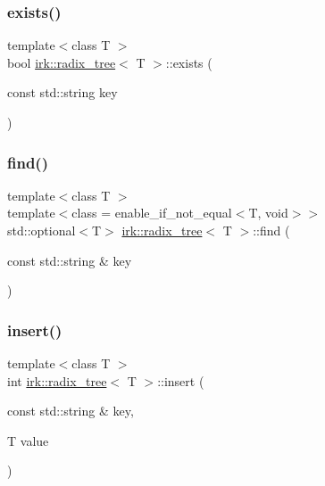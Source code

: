 \mbox{\label{classirk_1_1radix__tree_aaedca67d183c9b0b4f64c1b6ae240d7b}} 
\subsubsection{\texorpdfstring{exists()}{exists()}}
{\footnotesize\ttfamily template$<$class T $>$ \\
bool \mbox{\hyperlink{classirk_1_1radix__tree}{irk\+::radix\+\_\+tree}}$<$ T $>$\+::exists (\begin{DoxyParamCaption}\item[{const std\+::string}]{key }\end{DoxyParamCaption})\hspace{0.3cm}{\ttfamily [inline]}}

\mbox{\label{classirk_1_1radix__tree_a7a8f4484dd52244e712e204288e00b15}} 
\subsubsection{\texorpdfstring{find()}{find()}}
{\footnotesize\ttfamily template$<$class T $>$ \\
template$<$class  = enable\+\_\+if\+\_\+not\+\_\+equal$<$\+T, void$>$$>$ \\
std\+::optional$<$T$>$ \mbox{\hyperlink{classirk_1_1radix__tree}{irk\+::radix\+\_\+tree}}$<$ T $>$\+::find (\begin{DoxyParamCaption}\item[{const std\+::string \&}]{key }\end{DoxyParamCaption})\hspace{0.3cm}{\ttfamily [inline]}}

\mbox{\label{classirk_1_1radix__tree_ad65f1ba2c32c59c3b6fd2ca220a9fc7f}} 
\subsubsection{\texorpdfstring{insert()}{insert()}}
{\footnotesize\ttfamily template$<$class T $>$ \\
int \mbox{\hyperlink{classirk_1_1radix__tree}{irk\+::radix\+\_\+tree}}$<$ T $>$\+::insert (\begin{DoxyParamCaption}\item[{const std\+::string \&}]{key,  }\item[{T}]{value }\end{DoxyParamCaption})\hspace{0.3cm}{\ttfamily [inline]}}

